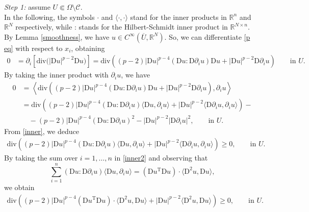 \documentclass[a4paper,11pt]{article}
\numberwithin{equation}{section}
\newcommand{\numberset}{\mathbb}
\newcommand{\Om}{\Omega}
\newcommand{\R}{\numberset{R}}
\newcommand{\rom}{\mathrm}
\theoremstyle{definition}
\begin{document}
\noindent
\textit{Step 1:} assume $U\Subset\Om\setminus\mathscr{C}$.\\
 In the following, the symbols $\cdot$ and $ \langle\cdot,\cdot\rangle$ stand for the inner products in $\R^n$ and $\R^N$ respectively, while : stands for the Hilbert-Schmidt inner product in $\R^{N\times n}$.\\
By Lemma \ref{smoothness}, we have $u\in C^\infty(\overline U,\R^N)$. So, we can differentiate \eqref{p eq} with respect to $x_i$, obtaining
\begin{align*}
0&=\partial_i\left[\rom{div}\big(|\rom Du|^{{p-2}}\rom Du\big)\right]=\rom{div}\left((p-2)|\rom Du|^{{p-4}}(\rom Du:\rom D\partial_i u)\rom Du+|\rom Du|^{{p-2}}\rom D\partial_iu\right)\qquad\mbox{in }U.
\end{align*}
By taking the inner product with $\partial_i u$, we have
\begin{equation}\label{inner}
\begin{aligned}
0&=\left\langle\rom{div}\left((p-2)|\rom Du|^{p-4}(\rom Du:\rom D\partial_i u)\rom Du+|\rom Du|^{{p-2}}\rom D\partial_i u\right),\partial_i u\right\rangle\\
&=\rom{div}\left((p-2)|\rom Du|^{p-4}(\rom Du:\rom D\partial_i u)\langle\rom Du,\partial_iu\rangle+|\rom Du|^{p-2}\langle\rom D\partial _iu,\partial_iu\rangle\right)-\\
&\quad-(p-2)|\rom Du|^{p-4}(\rom Du:\rom D\partial_i u)^2-|\rom Du|^{p-2}|\rom D\partial_iu|^2, \qquad\mbox{in }U.
\end{aligned}
\end{equation}
From \eqref{inner}, we deduce
\begin{equation}\label{inner2}
\begin{aligned}
\rom{div}\left((p-2)|\rom Du|^{p-4}(\rom Du:\rom D\partial_i u)\langle\rom Du,\partial_iu\rangle+|\rom Du|^{p-2}\langle\rom D\partial _iu,\partial_iu\rangle\right)\geq0, \qquad\mbox{in }U.
\end{aligned}
\end{equation}
By taking the sum over $i=1,\ldots,n$ in \eqref{inner2} and observing that
$$
\sum_{i=1}^n(\rom Du:\rom D\partial_i u)\langle\rom Du,\partial_iu\rangle=\left(\rom Du^\rom T\rom Du\right)\cdot\langle\rom D^2u, \rom Du\rangle,
$$
we obtain
\begin{equation}\label{inner3}
\begin{aligned}
\rom{div}\left((p-2)|\rom Du|^{p-4}\left(\rom Du^\rom T\rom Du\right)\cdot\langle\rom D^2u, \rom Du\rangle+|\rom Du|^{p-2}\langle\rom D^2u,\rom Du\rangle\right)\geq0, \qquad\mbox{in }U.
\end{aligned}
\end{equation}
\end{document}
